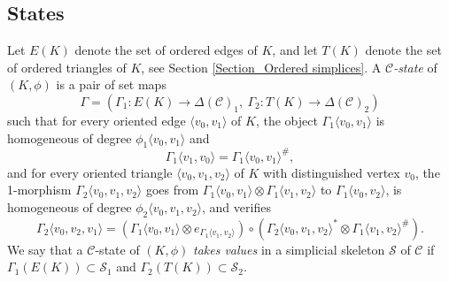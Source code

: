 \documentclass[a4paper, oneside]{amsart}
\numberwithin{equation}{subsection}
\theoremstyle{referencedlemma}
\theoremstyle{plain} %
\theoremstyle{remark}
\begin{document}
\subsection{States}

Let $E(K)$ denote the set of ordered edges of $K$, and let $T(K)$ denote the set of ordered triangles of $K$, see Section \ref{Section_Ordered simplices}.  A \emph{$\mathcal{C}$-state} of $(K,\phi)$ is a pair of set maps 
$$
\Gamma = (\Gamma_1 \colon E(K) \to \Delta(\mathcal{C})_1, \ \Gamma_2\colon T(K) \to \Delta(\mathcal{C})_2)
$$ such that for every oriented edge $\langle v_0, v_1\rangle$ of $K$, the object $\Gamma_1\langle v_0, v_1\rangle$ is homogeneous of degree $\phi_1\langle v_0, v_1\rangle$ and 
$$
\Gamma_1\langle v_1, v_0\rangle = \Gamma_1\langle v_0, v_1\rangle^\#,
$$
and for every oriented triangle $\langle v_0, v_1, v_2\rangle$ of $K$ with distinguished vertex $v_0$,  the 1-morphism $\Gamma_2\langle v_0, v_1, v_2\rangle$ goes from $\Gamma_1\langle v_0,v_1\rangle \otimes \Gamma_1\langle v_1, v_2\rangle$ to $\Gamma_1\langle v_0, v_2\rangle$,  is homogeneous of degree $\phi_2\langle v_0, v_1, v_2\rangle$, and verifies
$$
\Gamma_2\langle v_0, v_2, v_1\rangle = \left( \Gamma_1\langle v_0, v_1\rangle \otimes e_{\Gamma_1\langle v_1, v_2\rangle}\right) \circ \left( \Gamma_2\langle v_0, v_1, v_2\rangle^*\otimes \Gamma_1\langle v_1, v_2\rangle^\#\right).
$$
We say that a $\mathcal{C}$-state of $(K,\phi)$ \emph{takes values} in a simplicial skeleton $\mathcal{S}$ of $\mathcal{C}$ if $\Gamma_1(E(K))\subset \mathcal{S}_1$ and $\Gamma_2(T(K))\subset \mathcal{S}_2$. 
\end{document}
